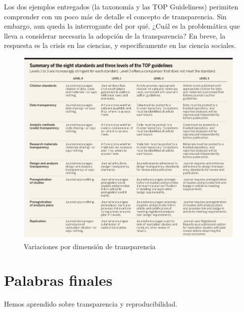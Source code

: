 \documentclass[
]{book}
\begin{document}
Los dos ejemplos entregados (la taxonomía y las TOP Guideliness) perimiten comprender con un poco más de detalle el concepto de transparencia. Sin embargo, aun queda la interrogante del por qué. ¿Cuál es la problemática que lleva a considerar necesaria la adopción de la transparencia? En breve, la respuesta es la crisis en las ciencias, y especificamente en las ciencia sociales.

\begin{figure}

{\centering \includegraphics[width=1\linewidth]{docs/images/table_top} 

}

\caption{Variaciones por dimensión de transparencia}\label{fig:tabtop}
\end{figure}

\hypertarget{palabras-finales}{%
\chapter{Palabras finales}\label{palabras-finales}}

Hemos aprendido sobre transparencia y reproducibilidad.

  
\end{document}
